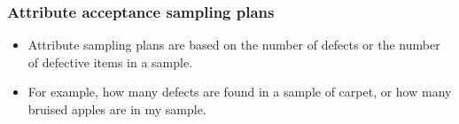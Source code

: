\begin{frame}




\frametitle{Attribute acceptance sampling plans}

\begin{itemize}
\item Attribute sampling plans are based on the number of defects or the number of defective items in a sample. 
\item For example, how many defects are found in a sample of carpet, or how many bruised apples are in my sample.
\end{itemize}

\end{frame}
